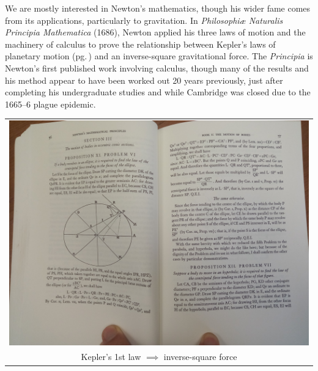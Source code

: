 \begin{minipage}[t]{0.53\linewidth}\vspace{-4pt}
	We are mostly interested in Newton's mathematics, though his wider fame comes from its applications, particularly to gravitation. In \emph{Philosophiæ Naturalis Principia Mathematica} (1686), Newton applied his three laws of motion\footnotemark{} and the machinery of calculus to prove the relationship between Kepler's laws of planetary motion (pg.\,\pageref{pg:keplerslaws}) and an inverse-square gravitational force. The \emph{Principia} is Newton's first published work involving calculus, though many of the results and his method appear to have been worked out 20 years previously, just after completing his undergraduate studies and while Cambridge was closed due to the 1665--6 plague epidemic.
\end{minipage}
\hfill
\begin{minipage}[t]{0.44\linewidth}\vspace{-5pt}
	\flushright
	\begin{tabular}{@{}c@{}}
		\includegraphics[width=\textwidth]{newton5.jpg}\\
		Kepler's 1st law $\implies$ inverse-square force
	\end{tabular}
\end{minipage}\smallbreak


\goodbreak
 
